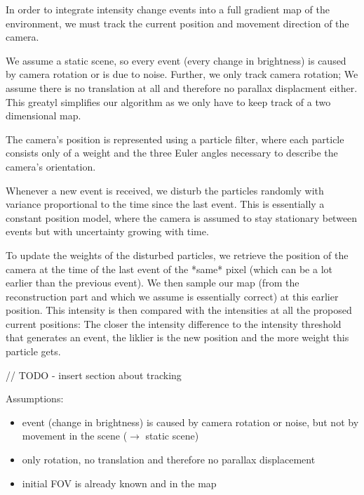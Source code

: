 In order to integrate intensity change events into a full gradient map of the
environment, we must track the current position and movement direction of the
camera.

We assume a static scene, so every event (every change in brightness) is caused
by camera rotation or is due to noise.
Further, we only track camera rotation; We assume there is no translation at
all and therefore no parallax displacment either. This greatyl simplifies our
algorithm as we only have to keep track of a two dimensional map.

The camera's position is represented using a particle filter, where each
particle consists only of a weight and the three Euler angles necessary to
describe the camera's orientation.

Whenever a new event is received, we disturb the particles randomly with
variance proportional to the time since the last event. This is essentially a
constant position model, where the camera is assumed to stay stationary between
events but with uncertainty growing with time.

To update the weights of the disturbed particles, we retrieve the position of
the camera at the time of the last event of the *same* pixel (which can be a
lot earlier than the previous event). We then sample our map (from the
reconstruction part and which we assume is essentially correct) at this earlier
position. This intensity is then compared with the intensities at all the
proposed current positions: The closer the intensity difference to the
intensity threshold that generates an event, the liklier is the new position
and the more weight this particle gets.


// TODO - insert section about tracking

Assumptions:
\begin{itemize}
\item event (change in brightness) is caused by camera rotation or noise, but not by movement in the scene ($\rightarrow$ static scene)
\item only rotation, no translation and therefore no parallax displacement
\item initial FOV is already known and in the map
\end{itemize}

